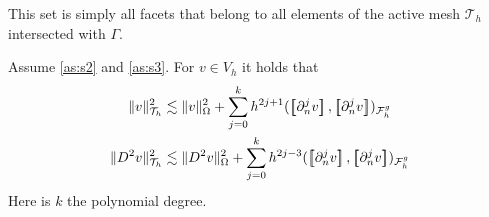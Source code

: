 This set is simply all facets that belong to all elements of the active mesh $\mathcal{T} _{h}$  intersected with $\Gamma $.

\begin{lemma}
    \label{lemma:bi_inv_gh_lemma}
    Assume \ref{as:s2} and \ref{as:s3}.
    For $v \in  V_{h}$ it holds that
        \begin{align}
            \label{eq:bi_inv_gh_1}
        \| v \|_{ \mathcal{T} _{h} }^{ 2 }  & \lesssim  \| v \|_{ \Omega  }^{ 2 }  + \sum_{j=0}^{k} h^{2j+1} ( \jump{ \partial ^{j}_{n} v }, \jump{ \partial ^{j}_{n} v}    )_{\mathcal{F}_{h}^{g}}\\
            \label{eq:bi_inv_gh_2}
        \| D ^2 v \|_{ \mathcal{T} _{h} }^{ 2 }  & \lesssim  \| D^2 v \|_{ \Omega  }^{ 2 }  + \sum_{j=0}^{k} h^{2j-3} ( \jump{ \partial ^{j}_{n} v }, \jump{ \partial ^{j}_{n}v }    )_{\mathcal{F}_{h}^{g}}
        \end{align}
        Here is $k$ the polynomial degree.
\end{lemma}


